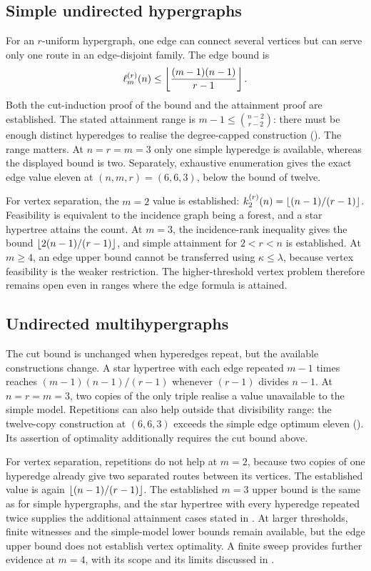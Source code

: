 \subsection{Simple undirected hypergraphs}
\label{sec:status-simple-hypergraph}

For an $r$-uniform hypergraph, one edge can connect several vertices but can
serve only one route in an edge-disjoint family. The edge bound is
\[
 \ell_m^{(r)}(n)\le\left\lfloor \frac{(m-1)(n-1)}{r-1} \right\rfloor.
\]
Both the cut-induction proof of the bound and the attainment proof are
established. The stated attainment range is
$m-1\le\binom{n-2}{r-2}$: there must be enough distinct hyperedges to realise
the degree-capped construction ().
The range matters. At $n=r=m=3$ only one simple hyperedge is available,
whereas the displayed bound is two. Separately, exhaustive enumeration gives
the exact edge value eleven at $(n,m,r)=(6,6,3)$, below the bound of twelve.

For vertex separation, the $m=2$ value is established:
$k_2^{(r)}(n)=\left\lfloor (n-1)/(r-1) \right\rfloor$. Feasibility is equivalent to the
incidence graph being a forest, and a star hypertree attains the count.
At $m=3$, the incidence-rank inequality gives the bound
$\left\lfloor 2(n-1)/(r-1) \right\rfloor$, and simple attainment for $2<r<n$ is established.
At $m\ge4$, an edge upper bound cannot be transferred using
$\kappa\le\lambda$, because vertex feasibility is the weaker restriction.
The higher-threshold vertex problem therefore remains open even in ranges
where the edge formula is attained.

\subsection{Undirected multihypergraphs}
\label{sec:status-multihypergraph}

The cut bound is unchanged when hyperedges repeat, but the available
constructions change. A star hypertree with each edge repeated $m-1$ times
reaches $(m-1)(n-1)/(r-1)$ whenever $(r-1)$ divides $n-1$. At $n=r=m=3$,
two copies of the only triple realise a value unavailable to the simple
model. Repetitions can also help outside that divisibility range: the
twelve-copy construction at $(6,6,3)$ exceeds the simple edge optimum eleven
(). Its assertion of optimality additionally
requires the cut bound above.

For vertex separation, repetitions do not help at $m=2$, because two copies
of one hyperedge already give two separated routes between its vertices.
The established value is again $\left\lfloor (n-1)/(r-1) \right\rfloor$. The established $m=3$
upper bound is the same as for simple hypergraphs, and the star hypertree with every hyperedge repeated twice
supplies the additional attainment cases stated in
. At larger thresholds, finite witnesses
and the simple-model lower bounds remain available, but the edge upper bound
does not establish vertex optimality.
A finite sweep provides further evidence at $m=4$, with its scope and its
limits discussed in .

